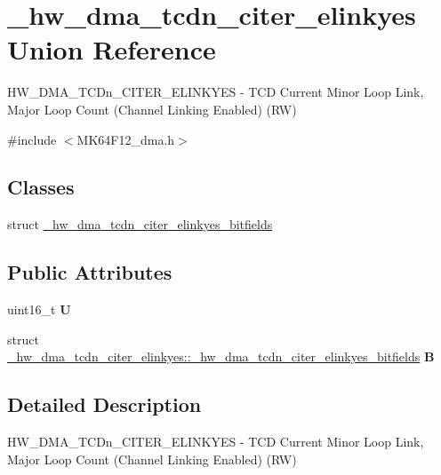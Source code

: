 \hypertarget{union__hw__dma__tcdn__citer__elinkyes}{}\section{\+\_\+hw\+\_\+dma\+\_\+tcdn\+\_\+citer\+\_\+elinkyes Union Reference}
\label{union__hw__dma__tcdn__citer__elinkyes}


H\+W\+\_\+\+D\+M\+A\+\_\+\+T\+C\+Dn\+\_\+\+C\+I\+T\+E\+R\+\_\+\+E\+L\+I\+N\+K\+Y\+ES -\/ T\+CD Current Minor Loop Link, Major Loop Count (Channel Linking Enabled) (RW)  




{\ttfamily \#include $<$M\+K64\+F12\+\_\+dma.\+h$>$}

\subsection*{Classes}
\begin{DoxyCompactItemize}
\item 
struct \hyperlink{struct__hw__dma__tcdn__citer__elinkyes_1_1__hw__dma__tcdn__citer__elinkyes__bitfields}{\+\_\+hw\+\_\+dma\+\_\+tcdn\+\_\+citer\+\_\+elinkyes\+\_\+bitfields}
\end{DoxyCompactItemize}
\subsection*{Public Attributes}
\begin{DoxyCompactItemize}
\item 
uint16\+\_\+t {\bfseries U}\hypertarget{union__hw__dma__tcdn__citer__elinkyes_ac71ab47259e4d9c84e6233ceee3df790}{}\label{union__hw__dma__tcdn__citer__elinkyes_ac71ab47259e4d9c84e6233ceee3df790}

\item 
struct \hyperlink{struct__hw__dma__tcdn__citer__elinkyes_1_1__hw__dma__tcdn__citer__elinkyes__bitfields}{\+\_\+hw\+\_\+dma\+\_\+tcdn\+\_\+citer\+\_\+elinkyes\+::\+\_\+hw\+\_\+dma\+\_\+tcdn\+\_\+citer\+\_\+elinkyes\+\_\+bitfields} {\bfseries B}\hypertarget{union__hw__dma__tcdn__citer__elinkyes_a323206b2775c21b202776cac592c2915}{}\label{union__hw__dma__tcdn__citer__elinkyes_a323206b2775c21b202776cac592c2915}

\end{DoxyCompactItemize}


\subsection{Detailed Description}
H\+W\+\_\+\+D\+M\+A\+\_\+\+T\+C\+Dn\+\_\+\+C\+I\+T\+E\+R\+\_\+\+E\+L\+I\+N\+K\+Y\+ES -\/ T\+CD Current Minor Loop Link, Major Loop Count (Channel Linking Enabled) (RW) 

